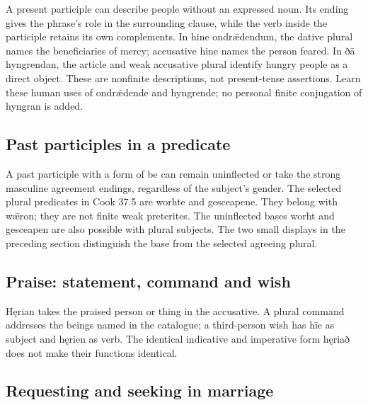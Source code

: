 A present participle can describe people without an expressed noun. Its ending gives the phrase’s role in the surrounding clause, while the verb inside the participle retains its own complements. In hine ondrǣdendum, the dative plural names the beneficiaries of mercy; accusative hine names the person feared. In ðā hyngrendan, the article and weak accusative plural identify hungry people as a direct object. These are nonfinite descriptions, not present-tense assertions. Learn these human uses of ondrǣdende and hyngrende; no personal finite conjugation of hyngran is added.

\subsection*{Past participles in a predicate}

A past participle with a form of be can remain uninflected or take the strong masculine agreement endings, regardless of the subject’s gender. The selected plural predicates in Cook 37.5 are worhte and gesceapene. They belong with wǣron; they are not finite weak preterites. The uninflected bases worht and gesceapen are also possible with plural subjects. The two small displays in the preceding section distinguish the base from the selected agreeing plural.

\subsection*{Praise: statement, command and wish}

Hęrian takes the praised person or thing in the accusative. A plural command addresses the beings named in the catalogue; a third-person wish has hīe as subject and hęrien as verb. The identical indicative and imperative form hęriað does not make their functions identical.

\subsection*{Requesting and seeking in marriage}

